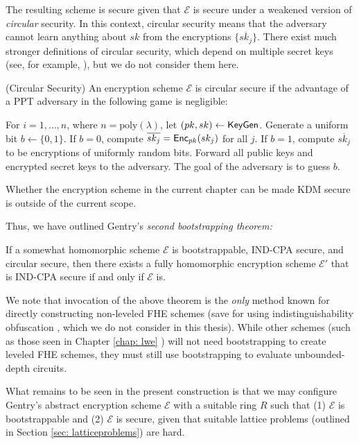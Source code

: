 The resulting scheme is secure given that $\mathcal{E}$ is secure under a weakened version of \emph{circular} security.
 In this context, circular security means that the adversary cannot learn anything about $sk$ from the encryptions $\{\overline{sk_j}\}$. There exist much stronger definitions of circular security, which depend on multiple secret keys (see, for example, \cite{circsecurity}), but we do not consider them here.


\begin{definition}(Circular Security)
An encryption scheme $\mathcal{E}$ is circular secure if the advantage of a PPT adversary in the following game is negligible:

For $i = 1, \dots, n$, where $n = \text{poly}(\lambda)$, let $(pk, sk) \leftarrow {\sf KeyGen}$. Generate a uniform bit $b \leftarrow \{0,1\}$. If $b = 0$, compute $\overline{sk_j} = {\sf Enc}_{pk}(sk_j)$ for all $j$. If $b = 1$, compute $\overline{sk_j}$ to be encryptions of uniformly random bits. Forward all public keys and encrypted secret keys to the adversary. The goal of the adversary is to guess $b$.
\end{definition}


Whether the encryption scheme in the current chapter can be made KDM secure is outside of the current scope.

Thus, we have outlined Gentry's \emph{second bootstrapping theorem:}
\begin{theorem}
    If a somewhat homomorphic scheme $\mathcal{E}$ is bootstrappable, IND-CPA secure, and circular secure, then there exists a fully homomorphic encryption scheme $\mathcal{E}'$ that is IND-CPA secure if and only if $\mathcal{E}$ is.
\end{theorem}

We note that invocation of the above theorem is the \emph{only} method known for directly constructing non-leveled FHE schemes \cite{chaosgentry} (save for using indistinguishability obfuscation \cite{Canetti2015}, which we do not consider in this thesis). While other schemes (such as those seen in Chapter \ref{chap: lwe} ) will not need bootstrapping to create leveled FHE schemes, they must still use bootstrapping to evaluate unbounded-depth circuits.

What remains to be seen in the present construction is that we may configure Gentry's abstract encryption scheme $\mathcal{E}$ with a suitable ring $R$ such that (1) $\mathcal{E}$ is bootstrappable and (2) $\mathcal{E}$ is secure, given that suitable lattice problems (outlined in Section \ref{sec: latticeproblems}) are hard.



